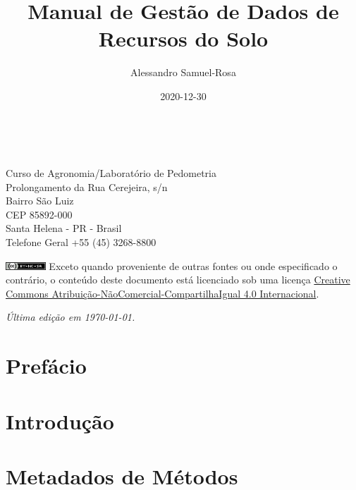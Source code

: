 \documentclass[a4paper,dvipsnames]{tufte-book}
\title{Manual de Gestão de Dados de Recursos do Solo}
\author{Alessandro Samuel-Rosa}
\date{2020-12-30}
\begin{document}
\maketitle

\newpage
\nopagecolor
\begin{fullwidth}
~\vfill
\thispagestyle{empty}
\setlength{\parindent}{0pt}
\setlength{\parskip}{\baselineskip}

\par{}

\par{
  Curso de Agronomia/Laboratório de Pedometria\\
  Prolongamento da Rua Cerejeira, s/n\\
  Bairro São Luiz\\
  CEP 85892-000\\
  Santa Helena - PR - Brasil\\
  Telefone Geral +55 (45) 3268-8800
}

\par{}

\par\includegraphics[width=1.5cm]{img/cc-by-nc-sa.png} Exceto quando proveniente de outras fontes ou onde especificado o contrário, o conteúdo deste documento está licenciado sob uma licença \href{http://creativecommons.org/licenses/by-nc-sa/4.0/}{Creative Commons Atribuição-NãoComercial-CompartilhaIgual 4.0 Internacional}.

\par\textit{Última edição em \today.}
\end{fullwidth}

{
\hypersetup{linkcolor=black}
\setcounter{tocdepth}{2}
\tableofcontents
}
\section*{Prefácio}\label{prefuxe1cio}

\section{Introdução}\label{intro}

\section{Metadados de Métodos}\label{metadados-de-muxe9todos}
\end{document}
